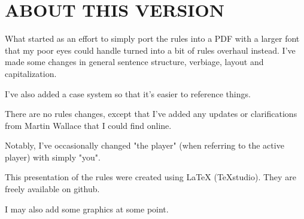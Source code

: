 \section{ABOUT THIS VERSION}

What started as an effort to simply port the rules into a PDF with a larger font that my poor eyes could handle turned into a bit of rules overhaul instead. I've made some changes in general sentence structure, verbiage, layout and capitalization.

I've also added a case system so that it's easier to reference things.

There are no rules changes, except that I've added any updates or clarifications from Martin Wallace that I could find online.

Notably, I've occasionally changed "the player" (when referring to the active player) with simply "you".

This presentation of the rules were created using LaTeX (TeXstudio). They are freely available on github.

I may also add some graphics at some point.